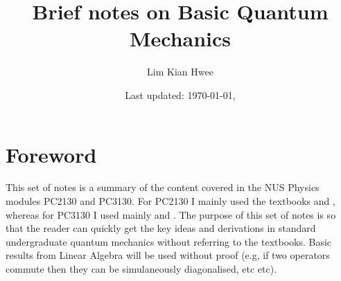 \documentclass[a4paper,12pt,oneside,onecolumn,final]{memoir} %
\title{Brief notes on Basic Quantum Mechanics}
\author{Lim Kian Hwee}
\date{\small Last updated: \today, \currenttime} %
\numberwithin{equation}{chapter} %
\theoremstyle{plain}
\theoremstyle{remark}
\theoremstyle{plain}
\theoremstyle{definition}
\theoremstyle{remark}
\begin{document}
  \frontmatter
  \maketitle
  \begin{KeepFromToc}
    \tableofcontents %
  \end{KeepFromToc}
  \chapter{Foreword}
    This set of notes is a summary of the content covered in the NUS Physics
    modules PC2130 and PC3130. For PC2130 I mainly used the textbooks
    \cite{schwindt2015conceptual} and \cite{shankar1994principles}, whereas
    for PC3130 I used mainly \cite{zettili2009quantum} and
    \cite{cohen1992quantum}. The purpose of this set of notes is so that the
    reader can quickly get the key ideas and derivations in standard
    undergraduate quantum mechanics without referring to the textbooks. Basic
    results from Linear Algebra will be used without proof (e.g, if two
    operators commute then they can be simulaneously diagonalised, etc etc).

    \printbibliography[type=book, heading=subbibliography,title={References}]


  \mainmatter
    
  
\end{document}
